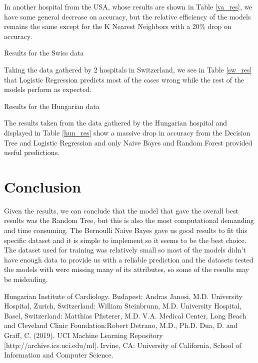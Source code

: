 \documentclass[conference]{IEEEtran}
\begin{document}
In another hospital from the USA\cite{va}, whose results are shown in Table \ref{va_res}, we have some general decrease on accuracy, but the relative efficiency of the models remains the same except for the K Nearest Neighbors with a 20\% drop on accuracy.

\begin{table}[htbp]
    \caption{Results for the Swiss data}
    \begin{center}
        
        \label{sw_res}
    \end{center}
\end{table}

Taking the data gathered by 2 hospitals in Switzerland\cite{swz1,swz2}, we see in Table \ref{sw_res} that Logistic Regression predicts most of the cases wrong while the rest of the models perform as expected.

\begin{table}[H]
    \caption{Results for the Hungarian data}
    \begin{center}
        
        \label{hun_res}
    \end{center}
\end{table}

The results taken from the data gathered by the Hungarian hospital\cite{hun} and displayed in Table \ref{hun_res} show a massive drop in accuracy from the Decision Tree and Logistic Regression and only Naive Bayes and Random Forest provided useful predictions.

\section{Conclusion}

Given the results, we can conclude that the model that gave the overall best results was the Random Tree, but this is also the most computational demanding and time consuming. The Bernoulli Naive Bayes gave us good results to fit this specific dataset and it is simple to implement so it seems to be the best choice.
\\The dataset used for training was relatively small so most of the models didn't have enough data to provide us with a reliable prediction and the datasets tested the models with were missing many of its attributes, so some of the results may be misleading.

\begin{thebibliography}{00}
     Hungarian Institute of Cardiology. Budapest: Andras Janosi, M.D.
     University Hospital, Zurich, Switzerland: William Steinbrunn, M.D.
     University Hospital, Basel, Switzerland: Matthias Pfisterer, M.D.
     V.A. Medical Center, Long Beach and Cleveland Clinic Foundation:Robert Detrano, M.D., Ph.D.
     Dua, D. and Graff, C. (2019). UCI Machine Learning Repository [http://archive.ics.uci.edu/ml]. Irvine, CA: University of California, School of Information and Computer Science.
\end{thebibliography}
\end{document}
